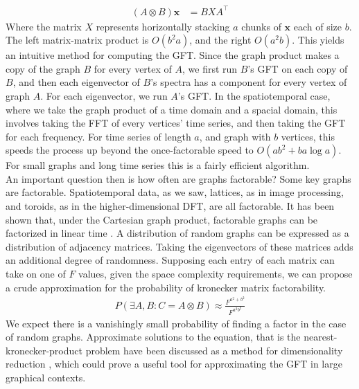 \documentclass[12pt,a4paper]{article} %
\begin{document}
\begin{align*}
    (A\otimes B) \mathbf{x}&=BXA^\top
\end{align*}
Where the matrix $X$ represents horizontally stacking $a$ chunks of $\mathbf{x}$ each of size $b$. The left matrix-matrix product is $O(b^2a)$, and the right $O(a^2b)$. This yields an intuitive method for computing the GFT. Since the graph product makes a copy of the graph $B$ for every vertex of $A$, we first run $B$'s GFT on each copy of $B$, and then each eigenvector of $B$'s spectra has a component for every vertex of graph $A$. For each eigenvector, we run $A$'s GFT. In the spatiotemporal case, where we take the graph product of a time domain and a spacial domain, this involves taking the FFT of every vertices' time series, and then taking the GFT for each frequency. For time series of length $a$, and graph with $b$ vertices, this speeds the process up beyond the once-factorable speed to $O(ab^2+ba\log a)$. For small graphs and long time series this is a fairly efficient algorithm.\\

An important question then is how often are graphs factorable? Some key graphs are factorable. Spatiotemporal data, as we saw, lattices, as in image processing, and toroids, as in the higher-dimensional DFT, are all factorable. It has been shown that, under the Cartesian graph product, factorable graphs can be factorized in linear time \cite{imrich}. A distribution of random graphs can be expressed as a distribution of adjacency matrices. Taking the eigenvectors of these matrices adds an additional degree of randomness. Supposing each entry of each matrix can take on one of $F$ values, given the space complexity requirements, we can propose a crude approximation for the probability of kronecker matrix factorability.
\begin{align*}
    P(\exists A,B:C=A\otimes B)\approx\frac{F^{a^2+b^2}}{F^{a^2b^2}}
\end{align*}
We expect there is a vanishingly small probability of finding a factor in the case of random graphs. Approximate solutions to the equation, that is the nearest-kronecker-product problem have been discussed as a method for dimensionality reduction \cite{loan}, which could prove a useful tool for approximating the GFT in large graphical contexts.
\end{document}
